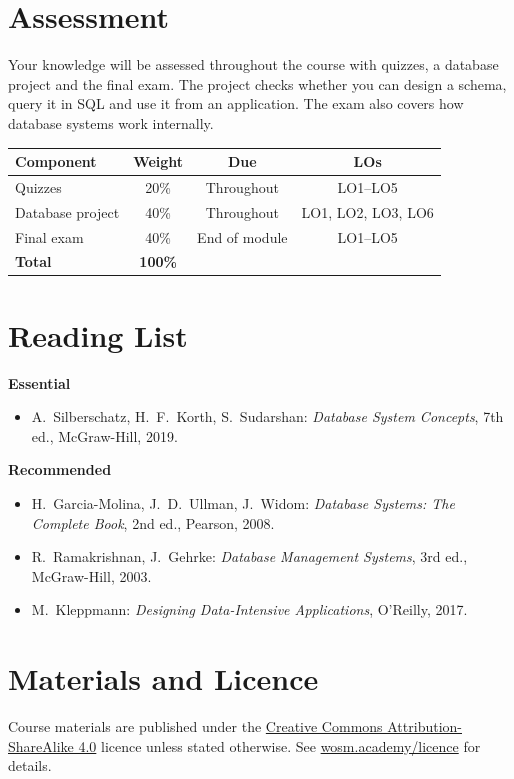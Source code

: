 \documentclass[11pt,a4paper]{article}
\begin{document}
\section{Assessment}
Your knowledge will be assessed throughout the course with quizzes, a database
project and the final exam. The project checks whether you can design a schema,
query it in SQL and use it from an application. The exam also covers how database
systems work internally.

\begin{tabularx}{\textwidth}{X c c c}
\toprule
\textbf{Component} & \textbf{Weight} & \textbf{Due} & \textbf{LOs} \\
\midrule
Quizzes & 20\% & Throughout & LO1--LO5 \\
Database project & 40\% & Throughout & LO1, LO2, LO3, LO6 \\
Final exam & 40\% & End of module & LO1--LO5 \\
\midrule
\textbf{Total} & \textbf{100\%} & & \\
\bottomrule
\end{tabularx}

\section{Reading List}
\textbf{Essential}
\begin{itemize}
  \item A.\ Silberschatz, H.\ F.\ Korth, S.\ Sudarshan: \textit{Database System Concepts}, 7th ed., McGraw-Hill, 2019.
\end{itemize}
\textbf{Recommended}
\begin{itemize}
  \item H.\ Garcia-Molina, J.\ D.\ Ullman, J.\ Widom: \textit{Database Systems: The Complete Book}, 2nd ed., Pearson, 2008.
  \item R.\ Ramakrishnan, J.\ Gehrke: \textit{Database Management Systems}, 3rd ed., McGraw-Hill, 2003.
  \item M.\ Kleppmann: \textit{Designing Data-Intensive Applications}, O'Reilly, 2017.
\end{itemize}

\section{Materials and Licence}
Course materials are published under the
\href{https://creativecommons.org/licenses/by-sa/4.0/}{Creative Commons Attribution-ShareAlike 4.0}
licence unless stated otherwise. See \href{https://wosm.academy/licence/}{wosm.academy/licence} for details.
\end{document}
